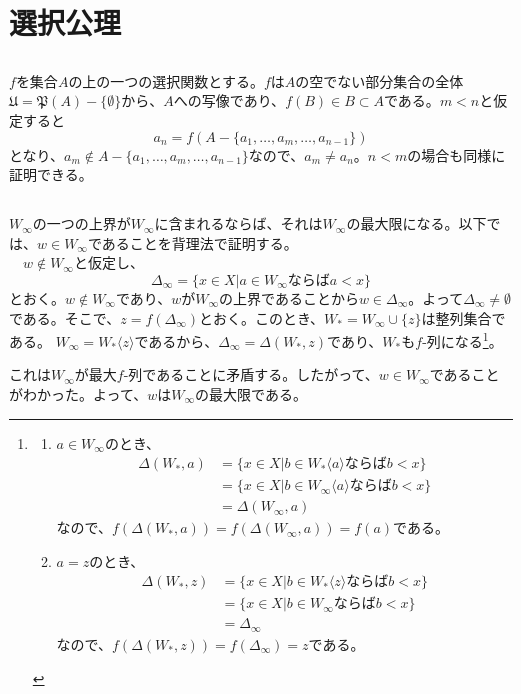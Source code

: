 \documentclass{jsarticle}
\begin{document}
\section{選択公理}
\subsection{}
$f$を集合$A$の上の一つの選択関数とする。$f$は$A$の空でない部分集合の全体$\mathfrak{U}=\mathfrak{P}(A)-\{\emptyset\}$から、$A$への写像であり、$f(B)\in B\subset A$である。$m<n$と仮定すると
\[a_n=f(A-\{a_1,\dots,a_m,\dots,a_{n-1}\})\]
となり、$a_m\notin A-\{a_1,\dots,a_m,\dots,a_{n-1}\}$なので、$a_m\neq a_n$。$n<m$の場合も同様に証明できる。

\subsection{}	
$W_\infty$の一つの上界が$W_\infty$に含まれるならば、それは$W_\infty$の最大限になる。以下では、$w\in W_\infty$であることを背理法で証明する。\\
　$w\notin W_\infty$と仮定し、
\[\Delta_\infty=\{x\in X| a\in W_\infty ならば a<x\}\]
とおく。$w\notin W_\infty$であり、$w$が$W_\infty$の上界であることから$w\in \Delta_\infty$。よって$\Delta_\infty\neq\emptyset$である。そこで、$z=f(\Delta_\infty)$とおく。このとき、$W_*=W_\infty\cup\{z\}$は整列集合である。
$W_\infty=W_*\langle z\rangle$であるから、$\Delta_\infty=\Delta(W_*,z)$であり、$W_*$も$f$-列になる\footnote{
\begin{enumerate}
\item
$a\in W_\infty$のとき、
\begin{align*}
\Delta(W_*, a)&=\{x\in X|b\in W_*\langle a\rangle ならば b<x\}\\
&=\{x\in X|b\in W_\infty\langle a\rangle ならば b<x\}\\
&=\Delta(W_\infty, a)
\end{align*}
なので、$f(\Delta(W_*, a))=f(\Delta(W_\infty, a))=f(a)$である。
\item
$a=z$のとき、
\begin{align*}
\Delta(W_*, z)&=\{x\in X|b\in W_*\langle z\rangle ならば b<x\}\\
&=\{x\in X|b\in W_\infty ならば b<x\}\\
&=\Delta_\infty
\end{align*}
なので、$f(\Delta(W_*, z))=f(\Delta_\infty)=z$である。
\end{enumerate}
}。

これは$W_\infty$が最大$f$-列であることに矛盾する。したがって、$w\in W_\infty$であることがわかった。よって、$w$は$W_\infty$の最大限である。
\end{document}
